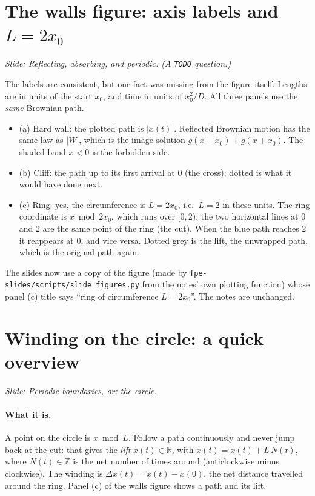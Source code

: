 \documentclass[11pt]{article}
\begin{document}
\section{The walls figure: axis labels and \texorpdfstring{$L=2x_0$}{L = 2x0}}
\emph{Slide: Reflecting, absorbing, and periodic. (A \texttt{TODO} question.)}

The labels are consistent, but one fact was missing from the figure itself. Lengths are in units of the start $x_0$,
and time in units of $x_0^2/D$. All three panels use the \emph{same} Brownian path.
\begin{itemize}
  \item (a) Hard wall: the plotted path is $|x(t)|$. Reflected Brownian motion has the same law as $|W|$, which is
        the image solution $g(x-x_0)+g(x+x_0)$. The shaded band $x<0$ is the forbidden side.
  \item (b) Cliff: the path up to its first arrival at $0$ (the cross); dotted is what it would have done next.
  \item (c) Ring: yes, the circumference is $L=2x_0$, i.e.\ $L=2$ in these units. The ring coordinate is
        $x\bmod 2x_0$, which runs over $[0,2)$; the two horizontal lines at $0$ and $2$ are the same point of the ring
        (the cut). When the blue path reaches $2$ it reappears at $0$, and vice versa. Dotted grey is the lift, the
        unwrapped path, which is the original path again.
\end{itemize}
The slides now use a copy of the figure (made by \texttt{fpe-slides/scripts/slide\_figures.py} from the notes' own
plotting function) whose panel (c) title says ``ring of circumference $L=2x_0$''. The notes are unchanged.

\section{Winding on the circle: a quick overview}
\emph{Slide: Periodic boundaries, or: the circle.}

\paragraph{What it is.} A point on the circle is $x\bmod L$. Follow a path continuously and never jump back at the cut:
that gives the \emph{lift} $\tilde x(t)\in\mathbb R$, with $\tilde x(t)=x(t)+L\,N(t)$, where $N(t)\in\mathbb Z$ is the
net number of times around (anticlockwise minus clockwise). The winding is $\Delta\tilde x(t)=\tilde x(t)-\tilde x(0)$,
the net distance travelled around the ring. Panel (c) of the walls figure shows a path and its lift.
\end{document}
